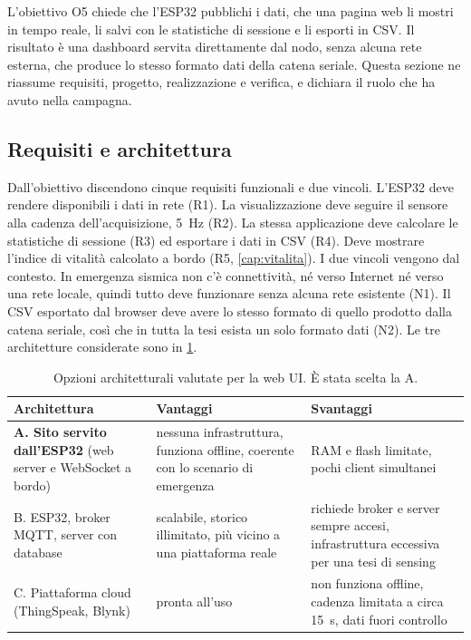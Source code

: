 L'obiettivo O5 chiede che l'ESP32 pubblichi i dati, che una pagina web li mostri in
tempo reale, li salvi con le statistiche di sessione e li esporti in CSV. Il
risultato è una dashboard servita direttamente dal nodo, senza alcuna rete esterna,
che produce lo stesso formato dati della catena seriale. Questa sezione ne riassume
requisiti, progetto, realizzazione e verifica, e dichiara il ruolo che ha avuto nella
campagna.

\subsection{Requisiti e architettura}
\label{sec:webui-requisiti}

Dall'obiettivo discendono cinque requisiti funzionali e due vincoli. L'ESP32 deve
rendere disponibili i dati in rete (R1). La visualizzazione deve seguire il sensore
alla cadenza dell'acquisizione, 5~Hz (R2). La stessa applicazione deve calcolare le
statistiche di sessione (R3) ed esportare i dati in CSV (R4). Deve mostrare l'indice
di vitalità calcolato a bordo (R5, \cref{cap:vitalita}). I due vincoli vengono dal
contesto. In emergenza sismica non c'è connettività, né verso Internet né verso una
rete locale, quindi tutto deve funzionare senza alcuna rete esistente (N1). Il CSV
esportato dal browser deve avere lo stesso formato di quello prodotto dalla catena
seriale, così che in tutta la tesi esista un solo formato dati (N2). Le tre
architetture considerate sono in \cref{tab:webui-opzioni}.

\begin{table}[htbp]
\forcerectofloat
\centering
\caption{Opzioni architetturali valutate per la web UI. È stata scelta la A.}
\label{tab:webui-opzioni}

\small
\begin{tabularx}{\linewidth}{@{}lXX@{}}
\toprule
\textbf{Architettura} & \textbf{Vantaggi} & \textbf{Svantaggi} \\
\midrule
\textbf{A. Sito servito dall'ESP32} (web server e WebSocket a bordo) &
  nessuna infrastruttura, funziona offline, coerente con lo scenario di emergenza &
  RAM e flash limitate, pochi client simultanei \\
B. ESP32, broker MQTT, server con database &
  scalabile, storico illimitato, più vicino a una piattaforma reale &
  richiede broker e server sempre accesi, infrastruttura eccessiva per una tesi di
  sensing \\
C. Piattaforma cloud (ThingSpeak, Blynk) &
  pronta all'uso &
  non funziona offline, cadenza limitata a circa 15~s, dati fuori controllo \\
\bottomrule
\end{tabularx}
\end{table}

